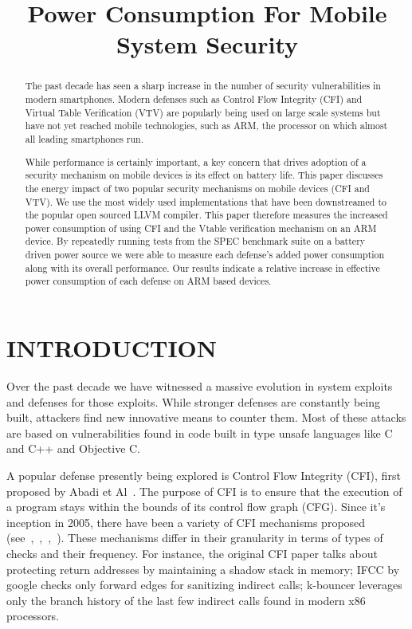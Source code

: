 \documentclass[letterpaper, 10 pt, conference]{ieeeconf}  %
\title{\LARGE \bf
Power Consumption For Mobile System Security
}
\begin{document}
\maketitle
\thispagestyle{empty}
\pagestyle{empty}


\begin{abstract}

The past decade has seen a sharp increase in the number of security vulnerabilities in modern smartphones. Modern defenses such as Control Flow Integrity (CFI) and Virtual Table Verification (VTV) are popularly being used on large scale systems but have not yet reached mobile technologies, such as ARM, the processor on which almost all leading smartphones run. 

While performance is certainly important, a key concern that drives adoption of a security mechanism on mobile devices is its effect on battery life. This paper discusses the energy impact of two popular security mechanisms on mobile devices (CFI and VTV). We use the most widely used implementations that have been downstreamed to the popular open sourced LLVM compiler. This paper therefore measures the increased power consumption of using CFI and the Vtable verification mechanism on an ARM device. By repeatedly running tests from the SPEC benchmark suite on a battery driven power source we were able to measure each defense's added power consumption along with its overall performance. Our results indicate a relative increase in effective power consumption of each defense on ARM based devices.
\end{abstract}

\section{INTRODUCTION}

Over the past decade we have witnessed a massive evolution in system exploits and defenses for those exploits. While stronger defenses are constantly being built, attackers find new innovative means to counter them. Most of these attacks are based on vulnerabilities found in code built in type unsafe languages like C and C++ and Objective C.

A popular defense presently being explored is Control Flow Integrity (CFI), first proposed by Abadi et Al~\cite{abadi}. The purpose of CFI is to ensure that the execution of a program stays within the bounds of its control flow graph (CFG). Since it's inception in 2005, there have been a variety of CFI mechanisms proposed (see~\cite{trop},~\cite{mocfi},~\cite{picfi},~\cite{safed}). These mechanisms differ in their granularity in terms of types of checks and their frequency. For instance, the original CFI paper talks about protecting return addresses by maintaining a shadow stack in memory; IFCC by google checks only forward edges for sanitizing indirect calls; k-bouncer leverages only the branch history of the last few indirect calls found in modern x86 processors.~\cite{trop}
\end{document}
